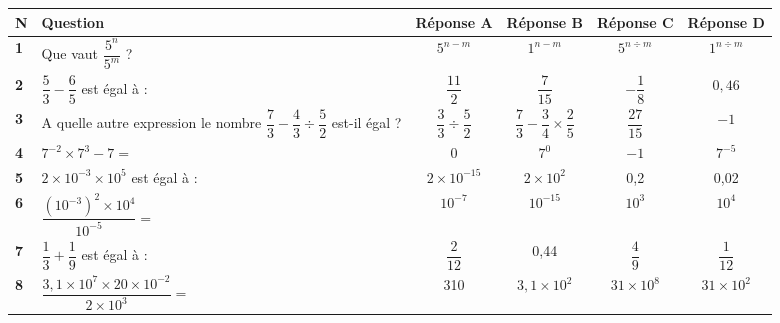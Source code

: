 \documentclass[a4paper,11pt]{article}
\begin{document}
\vspace*{0.25cm}

\renewcommand{\arraystretch}
{3.2}
\begin{tabular}{|p{0.75cm}|p{4.5cm}|c|c|c|c|}
\hline 
\textbf{N} & \textbf{Question} & \textbf{Réponse A} & \textbf{Réponse B} & \textbf{Réponse C} & \textbf{Réponse D} \\ 
\hline 
\textbf{1}& Que vaut $ \dfrac{5^{n}}{5^{m}} $ ?  & $5^{n-m}$ & $1^{n-m}$ & $5^{n\div m}$ & $1^{n \div m}$ \\ 
\hline 
\textbf{2}& $\dfrac{5}{3}-\dfrac{6}{5}$ est égal à : & $\dfrac{11}{2}$ & $\dfrac{7}{15}$  & $-\dfrac{1}{8}$  & $0,46$ \\ 
\hline 
\textbf{3} & A quelle autre expression le nombre $\dfrac{7}{3}-\dfrac{4}{3} \div \dfrac{5}{2}$ est-il égal ? & $\dfrac{3}{3} \div \dfrac{5}{2}$ & $\dfrac{7}{3}-\dfrac{3}{4} \times \dfrac{2}{5}$& $\dfrac{27}{15}$ & $-1$ \\ 
\hline 
\textbf{4} & $7^{-2} \times 7^{3}-7=$ & $0$ & $7^{0}$ & $-1$ & $7^{-5}$ \\ 
\hline 
\textbf{5} & $2 \times 10^{-3} \times 10^{5}$ est égal à : & $2 \times 10^{-15}$& $2 \times 10^{2}$ & 0,2 & 0,02 \\ 
\hline 
\textbf{6} & $\dfrac{(10^{-3})^{2} \times 10^{4}}{10^{-5}}=$ & $10^{-7}$ & $10^{-15}$ & $10^{3}$ & $10^{4}$ \\ 
\hline 
\textbf{7} & $\dfrac{1}{3}+\dfrac{1}{9} $ est égal à : & $\dfrac{2}{12}$ & 0,44& $\dfrac{4}{9}$& $\dfrac{1}{12}$ \\ 
\hline 
\textbf{8} & $\dfrac{3,1 \times 10^{7} \times 20 \times 10^{-2}}{2 \times 10^{3}}=$   & 310 & $3,1 \times 10^{2}$ & $31 \times 10^{8}$ & $31 \times 10^{2}$ \\ 
\hline 
\end{tabular} 
\end{document}
